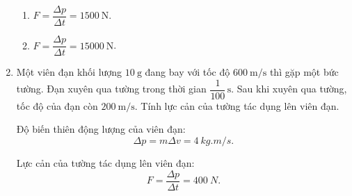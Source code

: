 \begin{enumerate}[label=\bfseries Câu \arabic*:, leftmargin=1.5cm]
	\hideall
	{	
		\begin{enumerate}[label=\alph*)]
			\item $F=\dfrac{\Delta p}{\Delta t}=\SI{1500}{\newton}$.
			\item $F=\dfrac{\Delta p}{\Delta t}=\SI{15000}{\newton}$.
		\end{enumerate}
	}
	\item {}
	
	
	{
		Một viên đạn khối lượng $\SI{10}{\gram}$ đang bay với tốc độ $\SI{600}{\meter/\second}$ thì gặp một bức tường. Đạn xuyên qua tường trong thời gian $\dfrac{1}{100}\,\text{s}$. Sau khi xuyên qua tường, tốc độ của đạn còn $\SI{200}{\meter/\second}$. Tính lực cản của tường tác dụng lên viên đạn.
	}
	
	\hideall
	{	
		Độ biến thiên động lượng của viên đạn:
		$$\Delta p = m\Delta v = \SI{4}{kg.m/s}.$$
		
		Lực cản của tường tác dụng lên viên đạn: $$F=\dfrac{\Delta p}{\Delta t} = \SI{400}{N}.$$
	}
	
\end{enumerate}